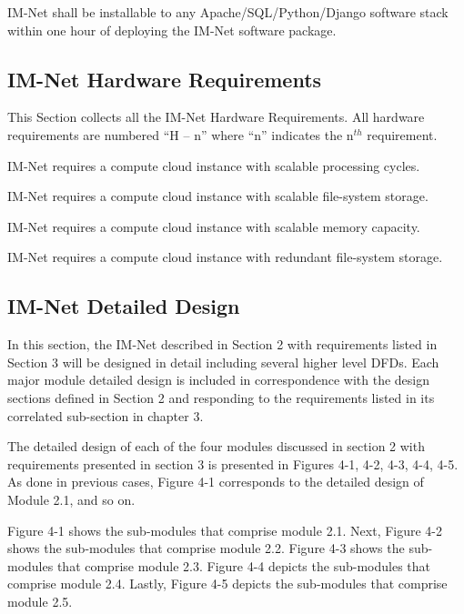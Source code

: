 \documentclass[letterpaper,12pt]{article}
\newcounter{qcounter}							%
\newcommand{\Section}[1]{\section{#1} \setcounter{figure}{0}}
\begin{document}
{\begin{list}{NF -- :~}{}
\item  IM-Net shall be installable to any Apache/SQL/Python/Django software stack within one hour of deploying the IM-Net software package.

\end{list}

\textcolor{subsection}{\subsection{IM-Net Hardware Requirements}}

This Section collects all the IM-Net Hardware Requirements. All hardware requirements are numbered ``H -- n'' where ``n'' indicates the n${}^{th}$ requirement.

\begin{list}{H -- :~}{}

\item IM-Net requires a compute cloud instance with scalable processing cycles.

\item IM-Net requires a compute cloud instance with scalable file-system storage.

\item IM-Net requires a compute cloud instance with scalable memory capacity.

\item IM-Net requires a compute cloud instance with redundant file-system storage.

\end{list}

\eject

\textcolor{section}{\Section{IM-Net Detailed Design}}

In this section, the IM-Net described in Section 2 with requirements listed in Section 3 will be designed in detail including several higher level DFDs. Each major module detailed design is included in correspondence with the design sections defined in Section 2 and responding to the requirements listed in its correlated sub-section in chapter 3.

The detailed design of each of the four modules discussed in section 2 with requirements presented in section 3 is presented in Figures 4-1, 4-2, 4-3, 4-4, 4-5. As done in previous cases, Figure 4-1 corresponds to the detailed design of Module 2.1, and so on.

Figure 4-1 shows the sub-modules that comprise module 2.1. Next, Figure 4-2 shows the  sub-modules that comprise module 2.2. Figure 4-3 shows the sub-modules that comprise module 2.3. Figure 4-4 depicts the sub-modules that comprise module 2.4. Lastly, Figure 4-5 depicts the sub-modules that comprise module 2.5.

}
\end{document}
